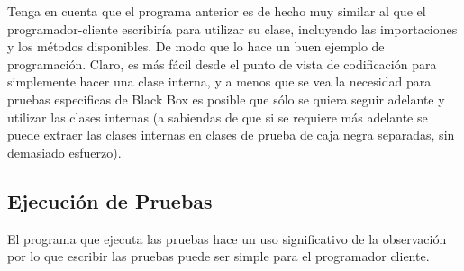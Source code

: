 Tenga en cuenta que el programa anterior es de hecho muy similar al que el programador-cliente escribiría para utilizar su clase, incluyendo las importaciones y los métodos disponibles. De modo que lo hace un buen ejemplo de programación. Claro, es más fácil desde el punto de vista de codificación para simplemente hacer una clase interna, y a menos que se vea la necesidad para pruebas especificas de Black Box es posible que sólo se quiera seguir adelante y utilizar las clases internas (a sabiendas de que si se requiere más adelante se puede extraer las clases internas en clases de prueba de caja negra separadas, sin demasiado esfuerzo).

\subsection*{Ejecución de Pruebas}
\label{subsec:edp}


El programa que ejecuta las pruebas hace un uso significativo de la observación por lo que escribir las pruebas puede ser simple para el programador cliente.    \newline

